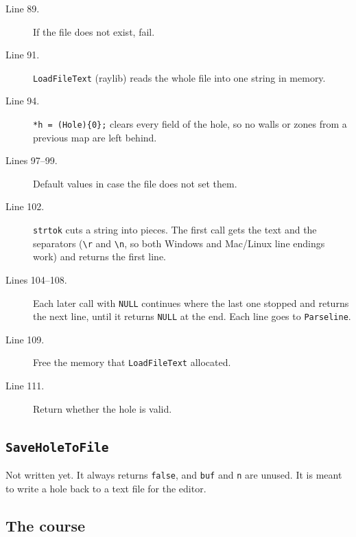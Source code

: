 \documentclass[11pt,a4paper]{article}
\newcommand{\code}[3]{}
\begin{document}
\begin{description}
  \item[Line 89.] If the file does not exist, fail.
  \item[Line 91.] \texttt{LoadFileText} (raylib) reads the whole file into one string in memory.
  \item[Line 94.] \texttt{*h = (Hole)\{0\};} clears every field of the hole, so no walls or zones from a previous map
  are left behind.
  \item[Lines 97--99.] Default values in case the file does not set them.
  \item[Line 102.] \texttt{strtok} cuts a string into pieces. The first call gets the text and the separators
  (\texttt{\textbackslash r} and \texttt{\textbackslash n}, so both Windows and Mac/Linux line endings work) and
  returns the first line.
  \item[Lines 104--108.] Each later call with \texttt{NULL} continues where the last one stopped and returns the next
  line, until it returns \texttt{NULL} at the end. Each line goes to \texttt{Parseline}.
  \item[Line 109.] Free the memory that \texttt{LoadFileText} allocated.
  \item[Line 111.] Return whether the hole is valid.
\end{description}

\subsection{\texttt{SaveHoleToFile}}

\code{level.c}{117}{124}

Not written yet. It always returns \texttt{false}, and \texttt{buf} and \texttt{n} are unused. It is meant to write a
hole back to a text file for the editor.

\subsection{The course}

\code{level.c}{127}{150}
\end{document}
